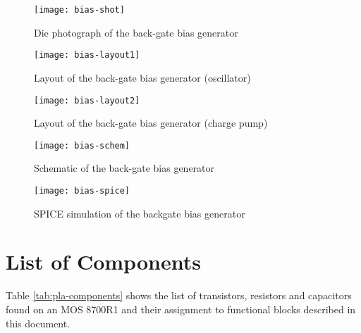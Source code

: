 \begin{figure}
    \centering
    \texttt{[image: bias-shot]}
    \caption{Die photograph of the back-gate bias generator}
    \label{fig:bias-shot}
\end{figure}

\begin{figure}
    \centering
    \texttt{[image: bias-layout1]}
    \caption{Layout of the back-gate bias generator (oscillator)}
    \label{fig:bias-layout1}
\end{figure}

\begin{figure}
    \centering
    \texttt{[image: bias-layout2]}
    \caption{Layout of the back-gate bias generator (charge pump)}
    \label{fig:bias-layout2}
\end{figure}

\begin{figure}
    \centering
    \texttt{[image: bias-schem]}
    \caption{Schematic of the back-gate bias generator}
   \label{fig:bias-schem}
\end{figure}


\begin{figure}
    \centering
    \texttt{[image: bias-spice]}
    \caption{SPICE simulation of the backgate bias generator}
    \label{fig:bias-spice}
\end{figure}

\clearpage
\section{List of Components}

Table \ref{tab:pla-components} shows the list of transistors, resistors and
capacitors found on an MOS 8700R1 and their assignment to functional blocks
described in this document.

